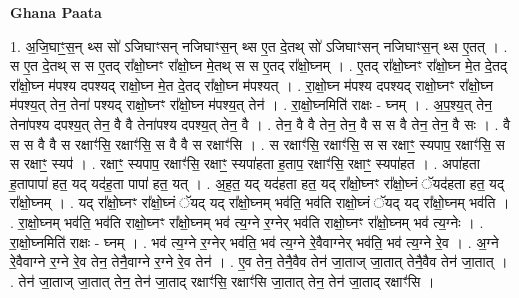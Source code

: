 \documentclass[17pt]{extarticle}
\begin{document}
\textbf{Ghana Paata } \newline

1. अ॒जि॒घाꣳ॒॒स॒न् थ्स सो॑ ऽजिघाꣳसन् नजिघाꣳस॒न् थ्स ए॒त दे॒तथ् सो॑ ऽजिघाꣳसन् नजिघाꣳस॒न् थ्स ए॒तत् । . स ए॒त दे॒तथ् स स ए॒तद् रा᳚क्षो॒घ्नꣳ रा᳚क्षो॒घ्न मे॒तथ् स स ए॒तद् रा᳚क्षो॒घ्नम् । . ए॒तद् रा᳚क्षो॒घ्नꣳ रा᳚क्षो॒घ्न मे॒त दे॒तद् रा᳚क्षो॒घ्न म॑पश्य दपश्यद् राक्षो॒घ्न मे॒त दे॒तद् रा᳚क्षो॒घ्न म॑पश्यत् । . रा॒क्षो॒घ्न म॑पश्य दपश्यद् राक्षो॒घ्नꣳ रा᳚क्षो॒घ्न म॑पश्य॒त् तेन॒ तेना॑ पश्यद् राक्षो॒घ्नꣳ रा᳚क्षो॒घ्न म॑पश्य॒त् तेन॑ । . रा॒क्षो॒घ्नमिति॑ राक्षः - घ्नम् । . अ॒प॒श्य॒त् तेन॒ तेना॑पश्य दपश्य॒त् तेन॒ वै वै तेना॑पश्य दपश्य॒त् तेन॒ वै । . तेन॒ वै वै तेन॒ तेन॒ वै स स वै तेन॒ तेन॒ वै सः । . वै स स वै वै स रक्षाꣳ॑सि॒ रक्षाꣳ॑सि॒ स वै वै स रक्षाꣳ॑सि । . स रक्षाꣳ॑सि॒ रक्षाꣳ॑सि॒ स स रक्षाꣳ॒॒ स्यपाप॒ रक्षाꣳ॑सि॒ स स रक्षाꣳ॒॒ स्यप॑ । . रक्षाꣳ॒॒ स्यपाप॒ रक्षाꣳ॑सि॒ रक्षाꣳ॒॒ स्यपा॑हता ह॒ताप॒ रक्षाꣳ॑सि॒ रक्षाꣳ॒॒ स्यपा॑हत । . अपा॑हता ह॒तापापा॑ हत॒ यद् यद॑ह॒ता पापा॑ हत॒ यत् । . अ॒ह॒त॒ यद् यद॑हता हत॒ यद् रा᳚क्षो॒घ्नꣳ रा᳚क्षो॒घ्नं ॅयद॑हता हत॒ यद् रा᳚क्षो॒घ्नम् । . यद् रा᳚क्षो॒घ्नꣳ रा᳚क्षो॒घ्नं ॅयद् यद् रा᳚क्षो॒घ्नम् भव॑ति॒ भव॑ति राक्षो॒घ्नं ॅयद् यद् रा᳚क्षो॒घ्नम् भव॑ति । . रा॒क्षो॒घ्नम् भव॑ति॒ भव॑ति राक्षो॒घ्नꣳ रा᳚क्षो॒घ्नम् भव॑ त्य॒ग्ने र॒ग्नेर् भव॑ति राक्षो॒घ्नꣳ रा᳚क्षो॒घ्नम् भव॑ त्य॒ग्नेः । . रा॒क्षो॒घ्नमिति॑ राक्षः - घ्नम् । . भव॑ त्य॒ग्ने र॒ग्नेर् भव॑ति॒ भव॑ त्य॒ग्ने रे॒वैवाग्नेर् भव॑ति॒ भव॑ त्य॒ग्ने रे॒व । . अ॒ग्ने रे॒वैवाग्ने र॒ग्ने रे॒व तेन॒ तेनै॒वाग्ने र॒ग्ने रे॒व तेन॑ । . ए॒व तेन॒ तेनै॒वैव तेन॑ जा॒ताज् जा॒तात् तेनै॒वैव तेन॑ जा॒तात् । . तेन॑ जा॒ताज् जा॒तात् तेन॒ तेन॑ जा॒ताद् रक्षाꣳ॑सि॒ रक्षाꣳ॑सि जा॒तात् तेन॒ तेन॑ जा॒ताद् रक्षाꣳ॑सि । \newline
\end{document}

